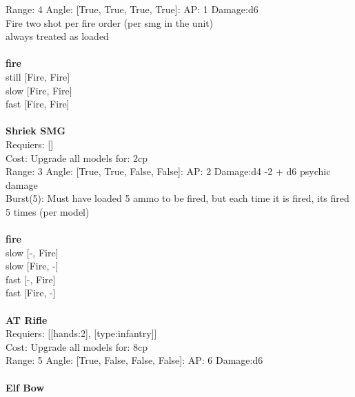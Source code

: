 Range: 4  Angle: [True, True, True, True]: AP: 1 Damage:d6 \\
Fire two shot per fire order (per smg in the unit)\\ 
always treated as loaded\\ 







\ \\ {\bf fire } \\
still [Fire, Fire] \\
slow [Fire, Fire] \\
fast [Fire, Fire] \\

\ \\
{\bf Shriek SMG } \\

Requiers: [] \\
Cost: Upgrade all models for: 2cp \\


Range: 3  Angle: [True, True, False, False]: AP: 2 Damage:d4 -2 + d6 psychic damage \\
Burst(5): Must have loaded 5 ammo to be fired, but each time it is fired, its fired 5 times (per model)\\ 







\ \\ {\bf fire } \\
slow [-, Fire] \\
slow [Fire, -] \\
fast [-, Fire] \\
fast [Fire, -] \\

\ \\
{\bf AT Rifle } \\

Requiers: [[hands:2], [type:infantry]] \\
Cost: Upgrade all models for: 8cp \\


Range: 5  Angle: [True, False, False, False]: AP: 6 Damage:d6 \\








\ \\
{\bf Elf Bow } \\

